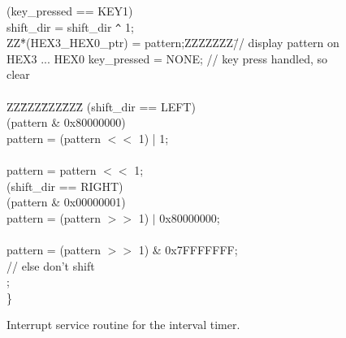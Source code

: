 \begin{figure}[h!]
\begin{center}
\begin{minipage}[t]{12.5 cm}
\begin{tabbing}
 (key\_pressed == KEY1)		\\
\>\>shift\_dir = shift\_dir \verb|^| 1;\\
ZZ\=*(HEX3\_HEX0\_ptr) = pattern;ZZZZZZZ\=// display pattern on HEX3 ... HEX0\kill
\>key\_pressed = NONE; \> // key press handled, so clear\\\\
ZZ\=ZZZ\=ZZZ\=ZZZ\=\kill
{} (shift\_dir == LEFT)\\
\> (pattern \& 0x80000000)\\
\>\>\>pattern = (pattern $<<$ 1) | 1;\\
\>\\
\>\>\>pattern = pattern $<<$ 1;\\
 (shift\_dir == RIGHT)\\
\> (pattern \& 0x00000001)			\\
\>\>\>pattern = (pattern $>>$ 1) $\mid$ 0x80000000;\\
\>\\
\>\>\>pattern = (pattern $>>$ 1) \& 0x7FFFFFFF;\\
\>// else don't shift\\
;\\
\}
\end{tabbing}
\end{minipage}
\end{center}
	\vspace{-0.33in}\caption{Interrupt service routine for the interval timer.}
   \label{fig:interval_timer_isr_C}
\end{figure}
